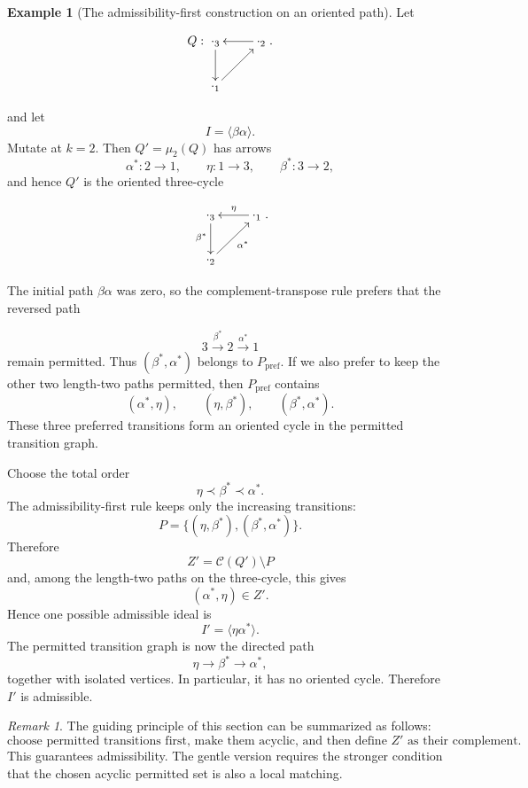 \documentclass[11pt]{article}
\theoremstyle{plain}
\theoremstyle{definition}
\newtheorem{example}[theorem]{Example}
\theoremstyle{remark}
\newtheorem{remark}[theorem]{Remark}
\begin{document}
\begin{example}[The admissibility-first construction on an oriented path]
Let

\begin{equation}\label{}
\nonumber  Q: \xymatrix{
\cdot_{3} \ar[d] & \ar[l]\cdot_{2} \\
	\cdot_{1}  \ar[ur]}.
  \end{equation}
  
and let
\[
  I=\langle \beta\alpha\rangle.
\]
Mutate at \(k=2\).  Then \(Q'=\mu_2(Q)\) has arrows
\[
  \alpha^*:2\to 1,
  \qquad
  \eta:1\to 3,
  \qquad
  \beta^*:3\to 2,
\]
and hence \(Q'\) is the oriented three-cycle


\begin{equation}\label{}
\nonumber   \xymatrix{
\cdot_{3} \ar[d]_{\beta^*} & \ar[l]_{\eta}\cdot_{1} \\
	\cdot_{2}  \ar[ur]_{\alpha^*}}.
  \end{equation}

The initial path \(\beta\alpha\) was zero, so the complement-transpose rule prefers
that the reversed path


\[
  3\xrightarrow{\beta^*}2\xrightarrow{\alpha^*}1
\]
remain permitted.  Thus \((\beta^*,\alpha^*)\) belongs to
\(P_{\mathrm{pref}}\).  If we also prefer to keep the other two length-two paths
permitted, then \(P_{\mathrm{pref}}\) contains
\[
  (\alpha^*,\eta),
  \qquad
  (\eta,\beta^*),
  \qquad
  (\beta^*,\alpha^*).
\]
These three preferred transitions form an oriented cycle in the permitted
transition graph.

Choose the total order
\[
  \eta\prec \beta^*\prec \alpha^*.
\]
The admissibility-first rule keeps only the increasing transitions:
\[
  P=\{(\eta,\beta^*), (\beta^*,\alpha^*)\}.
\]
Therefore
\[
  Z'=\mathcal C(Q')\setminus P
\]
and, among the length-two paths on the three-cycle, this gives
\[
  (\alpha^*,\eta)\in Z'.
\]
Hence one possible admissible ideal is
\[
  I'=\langle \eta\alpha^*\rangle.
\]
The permitted transition graph is now the directed path
\[
  \eta\longrightarrow \beta^*\longrightarrow \alpha^*,
\]
together with isolated vertices.  In particular, it has no oriented cycle.
Therefore \(I'\) is admissible.
\end{example}

\begin{remark}
The guiding principle of this section can be summarized as follows:
\[
  \boxed{
  \text{choose permitted transitions first, make them acyclic, and then define }
  Z'\text{ as their complement.}
  }
\]
This guarantees admissibility.  The gentle version requires the stronger
condition that the chosen acyclic permitted set is also a local matching.
\end{remark}
\end{document}
